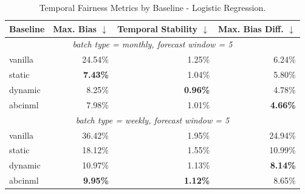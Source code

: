\begin{table}
  \caption{Temporal Fairness Metrics by Baseline - Logistic Regression.}
  \label{tab:temporal-lr}
  \begin{tabular}{lrrr}
    \toprule
    Baseline & Max. Bias $\downarrow$ & Temporal Stability $\downarrow$ & Max. Bias Diff. $\downarrow$ \\
    \midrule
    \multicolumn{4}{c}{\textit{batch type = monthly, forecast window = 5}} \\
    \midrule
    vanilla & 24.54\% & 1.25\% & 6.24\% \\
    static & \textbf{7.43\%} & 1.04\% & 5.80\% \\
    dynamic & 8.25\% & \textbf{0.96\%} & 4.78\% \\
    abcinml & 7.98\% & 1.01\% & \textbf{4.66\%} \\
    \midrule
    \multicolumn{4}{c}{\textit{batch type = weekly, forecast window = 5}} \\
    \midrule
    vanilla & 36.42\% & 1.95\% & 24.94\% \\
    static & 18.12\% & 1.55\% & 10.99\% \\
    dynamic & 10.97\% & 1.13\% & \textbf{8.14\%} \\
    abcinml & \textbf{9.95\%} & \textbf{1.12\%} & 8.65\% \\
    \bottomrule
  \end{tabular}
\end{table}
